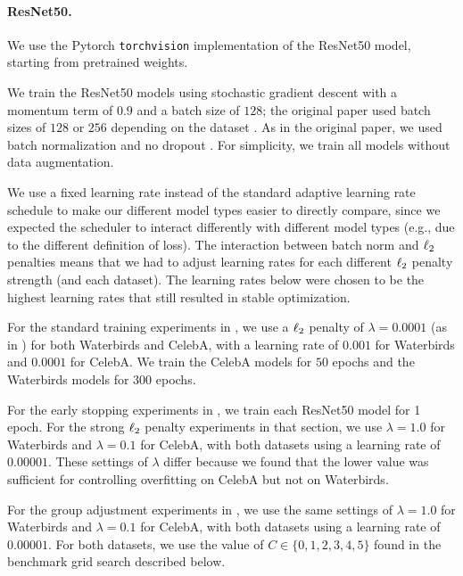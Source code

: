 \paragraph{ResNet50.}
We use the Pytorch \texttt{torchvision} implementation of the ResNet50 model,
starting from pretrained weights.

We train the ResNet50 models using stochastic gradient descent with a momentum term of $0.9$
and a batch size of $128$;
the original paper used batch sizes of $128$ or $256$ depending on the dataset \citep{he2016resnet}.
As in the original paper, we used batch normalization \citep{ioffe2015batch} and no dropout \citep{srivastava2014dropout}.
For simplicity, we train all models without data augmentation.

We use a fixed learning rate instead of the standard adaptive learning rate schedule to make our different model types easier to directly compare, since we expected the scheduler to interact differently with different model types
(e.g., due to the different definition of loss).
The interaction between batch norm and $\ell_2$ penalties means that we had to adjust learning rates for each different $\ell_2$ penalty strength (and each dataset).
The learning rates below were chosen to be the highest learning rates that still resulted in stable optimization.

For the standard training experiments in , we use a $\ell_2$ penalty of $\lambda = 0.0001$ (as in \citet{he2016resnet}) for both Waterbirds and CelebA,
with a learning rate of $0.001$ for Waterbirds and $0.0001$ for CelebA.
We train the CelebA models for $50$ epochs and the Waterbirds models for $300$ epochs.

For the early stopping experiments in , we train each ResNet50
model for 1 epoch. For the strong $\ell_2$ penalty experiments in that section, we use $\lambda = 1.0$ for Waterbirds and $\lambda = 0.1$ for CelebA, with both datasets using a learning rate of $0.00001$.
These settings of $\lambda$ differ because we found that the lower value was sufficient for controlling overfitting on CelebA but not on Waterbirds.

For the group adjustment experiments in ,
we use the same settings of $\lambda = 1.0$ for Waterbirds and $\lambda = 0.1$ for CelebA, with both datasets using a learning rate of $0.00001$.
For both datasets, we use the value of $C \in \{0, 1, 2, 3, 4, 5\}$ found in the benchmark grid search described below.

